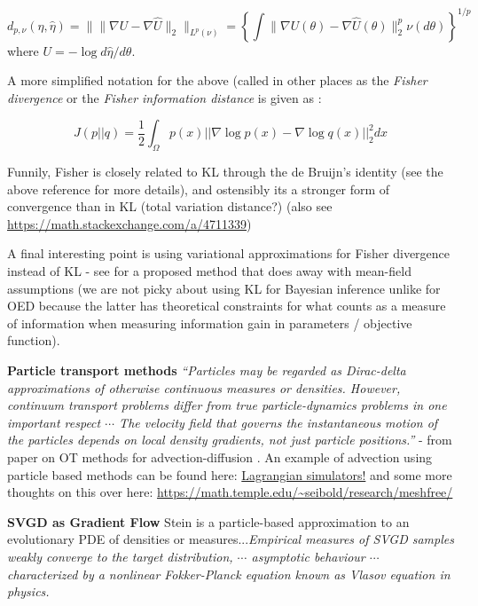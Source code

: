 \documentclass[12pt]{article}
\renewcommand{\[}{\left[}
\renewcommand{\]}{\right]}
\renewcommand{\(}{\left(}
\renewcommand{\)}{\right)}
\begin{document}
$$d_{p, \nu} (\eta, \hat{\eta}) = \| \| \nabla U - \nabla \hat{U}\|_2\|_{L^p(\nu)} = \left\{\int \| \nabla U(\theta) - \nabla \hat{U}(\theta) \|_2^p \nu(d\theta)\right\}^{1/p}$$ where $U = -\log d\hat{\eta}/d\theta$.

A more simplified notation for the above (called in other places as the \emph{Fisher divergence} or the \emph{Fisher information distance} is given as \citep{sriperumbudur_density_2017}:

$$J(p || q) = \frac{1}{2} \int_{\Omega} p(x) ||\nabla \log p(x) - \nabla \log q(x)||_2^2 dx$$

Funnily, Fisher is closely related to KL through the de Bruijn's identity (see the above reference for more details), and ostensibly its a stronger form of convergence than in KL (total variation distance?) (also see \url{https://math.stackexchange.com/a/4711339})

A final interesting point is using variational approximations for Fisher divergence instead of KL - see \cite{yang_variational_2019} for a proposed method that does away with mean-field assumptions (we are not picky about using KL for Bayesian inference unlike for OED because the latter has theoretical constraints for what counts as a measure of information when measuring information gain in parameters / objective function).


\noindent \textbf{Particle transport methods} \emph{``Particles may be regarded as Dirac-delta approximations of otherwise continuous measures or densities. However, continuum transport problems differ from true particle-dynamics problems in one important respect $\cdots$ The velocity field that governs the instantaneous motion of the particles depends on local density gradients, not just particle positions.''} - from paper on OT methods for advection-diffusion \cite{fedeli_geometrically-exact_2017}. An example of advection using particle based methods can be found here: \href{https://docs.oceanparcels.org/en/latest/examples/tutorial_analyticaladvection.html}{Lagrangian simulators!} and some more thoughts on this over here: \url{https://math.temple.edu/~seibold/research/meshfree/}

\noindent \textbf{SVGD as Gradient Flow} Stein is a particle-based approximation to an evolutionary PDE of densities or measures...\emph{Empirical measures of SVGD samples weakly converge to the target distribution, $\cdots$ asymptotic behaviour $\cdots$ characterized by a nonlinear Fokker-Planck equation known as Vlasov equation in physics.} \cite{liu_stein_2017}
\end{document}
